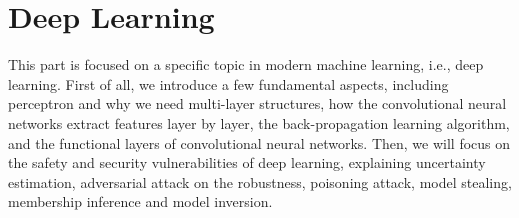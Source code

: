 \chapter{Deep Learning}\label{chap:deep}\label{part:deep}

This part is focused on a specific topic in modern machine learning, i.e., deep learning. First of all, we introduce a few fundamental aspects, including perceptron and why we need multi-layer structures, how the convolutional neural networks extract features layer by layer, the back-propagation learning algorithm, and the functional layers of convolutional neural networks. Then, we will focus on the safety and security vulnerabilities of deep learning, explaining uncertainty estimation, adversarial attack on the robustness, poisoning attack, model stealing, membership inference and model inversion.  


